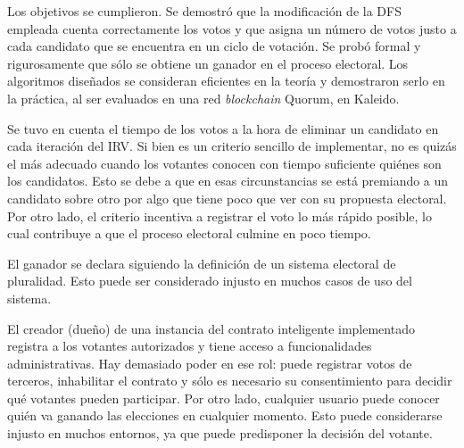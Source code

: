 \begin{conclusions}
    Los objetivos se cumplieron. Se demostr\'o que la modificaci\'on de la DFS empleada cuenta correctamente los votos y que asigna un n\'umero de votos justo a cada candidato que se encuentra en un ciclo de votaci\'on. Se prob\'o formal y rigurosamente que s\'olo se obtiene un ganador en el proceso electoral. Los algoritmos dise\~nados se consideran eficientes en la teor\'ia y demostraron serlo  en la pr\'actica, al ser evaluados en una red \textit{blockchain} Quorum, en Kaleido. 

    Se tuvo en cuenta el tiempo de los votos a la hora de eliminar un candidato  en cada iteraci\'on del IRV. Si bien es un criterio sencillo de implementar, no es quiz\'as el m\'as adecuado cuando los votantes conocen con tiempo suficiente qui\'enes son los candidatos. Esto se debe a que en esas circunstancias se est\'a premiando a un candidato sobre otro por algo que tiene poco que ver con su propuesta electoral. Por otro lado, el criterio incentiva a registrar el voto lo m\'as r\'apido posible, lo cual contribuye a que  el proceso electoral culmine en poco tiempo.

    El ganador se declara siguiendo  la definici\'on de un sistema electoral de pluralidad. Esto puede ser considerado injusto en muchos  casos de uso del sistema.

    El creador (due\~no) de una instancia del contrato inteligente implementado  registra a los votantes autorizados y tiene acceso a funcionalidades administrativas. Hay demasiado poder en ese rol: puede registrar votos de terceros, inhabilitar el contrato y s\'olo es necesario su consentimiento para  decidir qu\'e votantes pueden participar. Por otro lado, cualquier usuario puede conocer qui\'en va ganando las elecciones en cualquier momento. Esto puede considerarse injusto en muchos entornos, ya que puede predisponer la decisi\'on del votante.

\end{conclusions}
